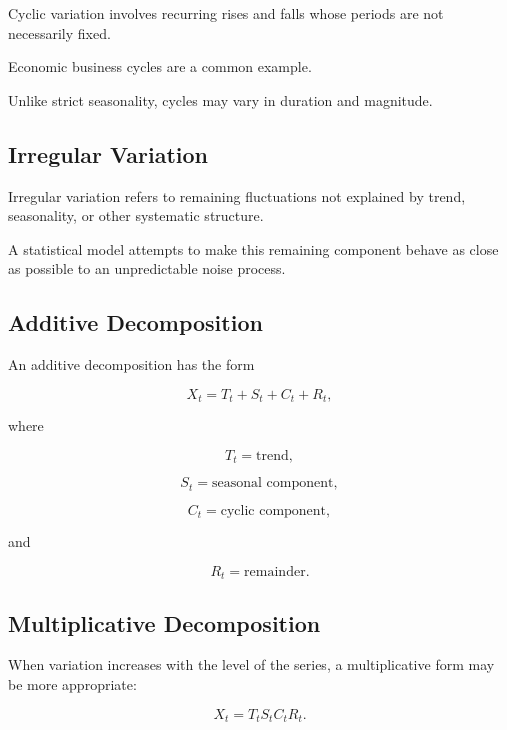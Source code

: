 Cyclic variation involves recurring rises and falls whose periods are not
necessarily fixed.

Economic business cycles are a common example.

Unlike strict seasonality, cycles may vary in duration and magnitude.

\subsection{Irregular Variation}
\label{subsec:time-series-irregular}

Irregular variation refers to remaining fluctuations not explained by
trend, seasonality, or other systematic structure.

A statistical model attempts to make this remaining component behave as
close as possible to an unpredictable noise process.

\subsection{Additive Decomposition}
\label{subsec:additive-time-series-decomposition}

An additive decomposition has the form

\[
\boxed{
X_t
=
T_t
+
S_t
+
C_t
+
R_t,
}
\]

where

\[
T_t
=
\text{trend},
\]

\[
S_t
=
\text{seasonal component},
\]

\[
C_t
=
\text{cyclic component},
\]

and

\[
R_t
=
\text{remainder}.
\]

\subsection{Multiplicative Decomposition}
\label{subsec:multiplicative-time-series-decomposition}

When variation increases with the level of the series, a multiplicative
form may be more appropriate:

\[
\boxed{
X_t
=
T_tS_tC_tR_t.
}
\]

